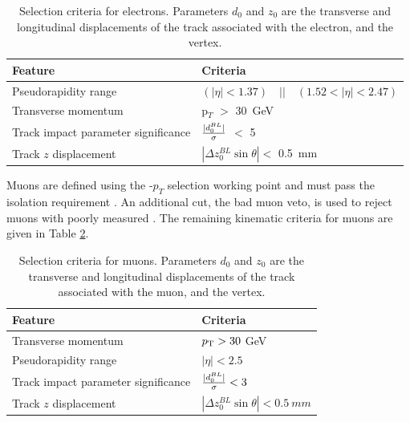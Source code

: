 \begin{table}[!htb]
\caption{Selection criteria for electrons. Parameters $d_{0}$ and $z_{0}$ are the transverse and longitudinal displacements of the track associated with the electron, and the vertex.}
\begin{center}
    \begin{tabular}[ht]{l l}
    \toprule
    Feature & Criteria \\
    \midrule
    Pseudorapidity range & $(|\eta| < 1.37) \quad || \quad (1.52 < |\eta| < 2.47)$ \\
    Transverse momentum & p$_T$ $>$ 30~GeV \\
    Track impact parameter significance & ${|d_{0}^{BL}|\over\sigma}$ $<$ 5 \\
    Track $z$ displacement & $|\Delta z_{0}^{BL} \sin{\theta}| <$ 0.5~mm \\
    \bottomrule
    \end{tabular}
\end{center}
\label{tab:ciElectronSel}
\end{table}

Muons are defined using the -$p_T$ selection working point and must pass the isolation requirement .
An additional cut, the bad muon veto, is used to reject muons with poorly measured \pt.
The remaining kinematic criteria for muons are given in Table \ref{tab:ciMuonsSel}.

\begin{table}[ht]
\caption{Selection criteria for muons. Parameters $d_{0}$ and $z_{0}$ are the transverse and longitudinal displacements of the track associated with the muon, and the vertex.}
\begin{center}
    \begin{tabular}[ht]{l l}
    \toprule
    Feature & Criteria \\
    \midrule
    Transverse momentum  & $p_\text{T}>30$ GeV\\
    Pseudorapidity range & $|\eta|<2.5$ \\
    Track impact parameter significance & ${|d_{0}^{BL}|\over\sigma}< 3$ \\
    Track $z$ displacement  & $|\Delta z_{0}^{BL} \sin{\theta}| < 0.5~mm$\\
    \bottomrule
    \end{tabular}
\end{center}
\label{tab:ciMuonsSel}
\end{table}

